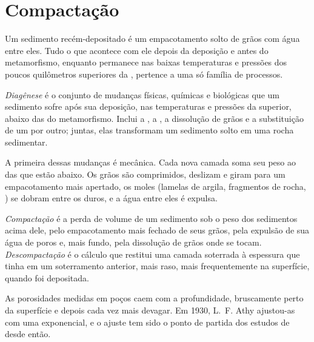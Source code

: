 \section{Compactação}\label{sec:b1:diagenesis-basins:compaction}

Um sedimento recém-depositado é um empacotamento solto de grãos com água entre eles. Tudo o
que acontece com ele depois da deposição e antes do metamorfismo, enquanto permanece nas
baixas temperaturas e pressões dos poucos quilômetros superiores da , pertence a uma
só família de processos.

\begin{definition}[Diagênese]\label{def:b1:diagenesis-basins:diagenesis}
\emph{Diagênese} é o conjunto de mudanças físicas, químicas e biológicas
que um sedimento sofre após sua deposição, nas temperaturas e pressões da  superior,
abaixo das do metamorfismo. Inclui a , a , a dissolução de grãos e a
substituição de um  por outro; juntas, elas transformam um sedimento solto em uma
rocha sedimentar.
\end{definition}

A primeira dessas mudanças é mecânica. Cada nova camada soma seu peso ao das que estão
abaixo. Os grãos são comprimidos, deslizam e giram para um empacotamento mais apertado, os
moles (lamelas de argila, fragmentos de rocha, ) se dobram entre os duros, e a água
entre eles é expulsa.

\begin{definition}\label{def:b1:diagenesis-basins:compaction}
\emph{Compactação} é a perda de volume de um sedimento sob o peso dos
sedimentos acima dele, pelo empacotamento mais fechado de seus grãos, pela expulsão de sua
água de poros e, mais fundo, pela dissolução de grãos onde se tocam.
\emph{Descompactação} é o cálculo que restitui uma camada soterrada à
espessura que tinha em um soterramento anterior, mais raso, mais frequentemente na
superfície, quando foi depositada.
\end{definition}

As porosidades medidas em poços caem com a profundidade, bruscamente perto da superfície e
depois cada vez mais devagar. Em 1930, L.~F. Athy ajustou-as com uma exponencial, e o ajuste
tem sido o ponto de partida dos estudos de  desde então.

